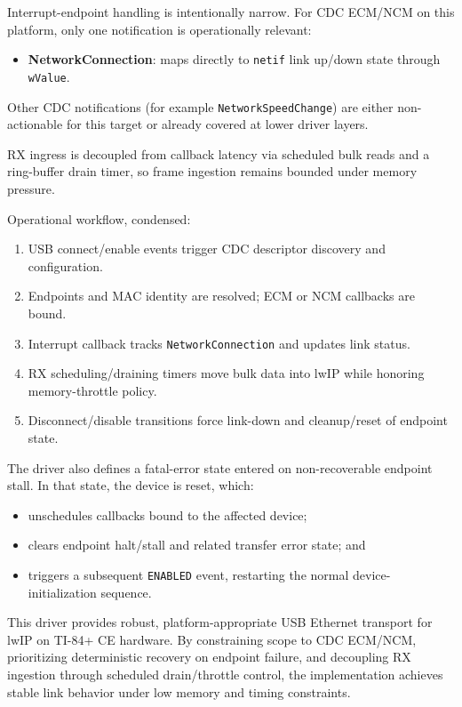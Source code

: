 \documentclass[titlepage]{report}
\begin{document}
		Interrupt-endpoint handling is intentionally narrow. For CDC ECM/NCM on this platform, only one notification is operationally relevant:
		\begin{itemize}
			\item \textbf{NetworkConnection}: maps directly to \texttt{netif} link up/down state through \texttt{wValue}.
		\end{itemize}
		Other CDC notifications (for example \texttt{NetworkSpeedChange}) are either non-actionable for this target or already covered at lower driver layers.

		RX ingress is decoupled from callback latency via scheduled bulk reads and a ring-buffer drain timer, so frame ingestion remains bounded under memory pressure.

		Operational workflow, condensed:
		\begin{enumerate}
			\item USB connect/enable events trigger CDC descriptor discovery and configuration.
			\item Endpoints and MAC identity are resolved; ECM or NCM callbacks are bound.
			\item Interrupt callback tracks \texttt{NetworkConnection} and updates link status.
			\item RX scheduling/draining timers move bulk data into lwIP while honoring memory-throttle policy.
			\item Disconnect/disable transitions force link-down and cleanup/reset of endpoint state.
		\end{enumerate}
		
		The driver also defines a fatal-error state entered on non-recoverable endpoint stall. In that state, the device is reset, which:
		\begin{itemize}
			\item unschedules callbacks bound to the affected device;
			\item clears endpoint halt/stall and related transfer error state; and
			\item triggers a subsequent \texttt{ENABLED} event, restarting the normal device-initialization sequence.
		\end{itemize}
		
		This driver provides robust, platform-appropriate USB Ethernet transport for lwIP on TI-84+ CE hardware. By constraining scope to CDC ECM/NCM, prioritizing deterministic recovery on endpoint failure, and decoupling RX ingestion through scheduled drain/throttle control, the implementation achieves stable link behavior under low memory and timing constraints.
		
\end{document}
